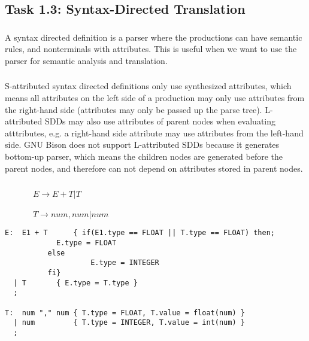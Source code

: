 \subsection{Task 1.3: Syntax-Directed Translation}


\subsubsection{}
A syntax directed definition is a parser where the productions can have semantic rules, and nonterminals with attributes.
This is useful when we want to use the parser for semantic analysis and translation. 

\subsubsection{}
S-attributed syntax directed definitions only use synthesized attributes, which means all attributes on the left side of a production may only use attributes from the right-hand side (attributes may only be passed up the parse tree).
L-attributed SDDs may also use attributes of parent nodes when evaluating atttributes, e.g. a right-hand side attribute may use attributes from the left-hand side.
GNU Bison does not support L-attributed SDDs because it generates bottom-up parser, which means the children nodes are generated before the parent nodes, and therefore can not depend on attributes stored in parent nodes.

\subsubsection{}

\begin{description}
 \item[] $E \rightarrow E + T | T$
 \item[] $T \rightarrow num , num | num$
\end{description}

\begin{lstlisting}
E:  E1 + T      { if(E1.type == FLOAT || T.type == FLOAT) then;
			E.type = FLOAT
		  else
	                E.type = INTEGER
		  fi}
  | T		{ E.type = T.type }
  ;
 
T:  num "," num { T.type = FLOAT, T.value = float(num) }
  | num         { T.type = INTEGER, T.value = int(num) }
  ;

\end{lstlisting}






